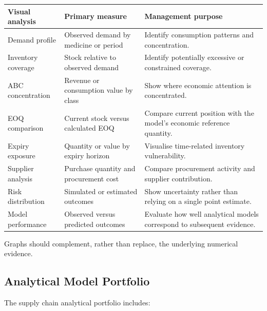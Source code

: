 \documentclass[12pt]{article}
\begin{document}
\begin{center}

\begin{tabularx}{\textwidth}{p{40mm} X X}
\hline
\textbf{Visual analysis} &
\textbf{Primary measure} &
\textbf{Management purpose} \\
\hline

Demand profile &
Observed demand by medicine or period &
Identify consumption patterns and concentration. \\

Inventory coverage &
Stock relative to observed demand &
Identify potentially excessive or constrained coverage. \\

ABC concentration &
Revenue or consumption value by class &
Show where economic attention is concentrated. \\

EOQ comparison &
Current stock versus calculated EOQ &
Compare current position with the model's economic reference quantity. \\

Expiry exposure &
Quantity or value by expiry horizon &
Visualise time-related inventory vulnerability. \\

Supplier analysis &
Purchase quantity and procurement cost &
Compare procurement activity and supplier contribution. \\

Risk distribution &
Simulated or estimated outcomes &
Show uncertainty rather than relying on a single point estimate. \\

Model performance &
Observed versus predicted outcomes &
Evaluate how well analytical models correspond to subsequent evidence. \\

\hline
\end{tabularx}

\end{center}

Graphs should complement, rather than replace, the underlying numerical
evidence.

\subsection{Analytical Model Portfolio}

The supply chain analytical portfolio includes:
\end{document}
